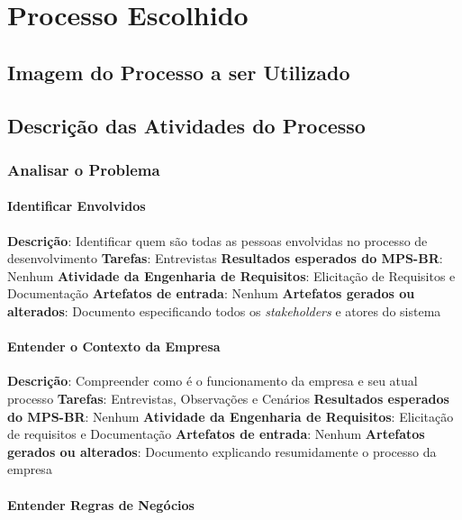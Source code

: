 \chapter{Processo Escolhido}
\label{chosen-process}

\section{Imagem do Processo a ser Utilizado}

\section{Descrição das Atividades do Processo}

\subsection{Analisar o Problema}

\subsubsection{Identificar Envolvidos}

\textbf{Descrição}: Identificar quem são todas as pessoas envolvidas no processo de desenvolvimento
\textbf{Tarefas}: Entrevistas
\textbf{Resultados esperados do MPS-BR}: Nenhum
\textbf{Atividade da Engenharia de Requisitos}: Elicitação de Requisitos e Documentação
\textbf{Artefatos de entrada}: Nenhum
\textbf{Artefatos gerados ou alterados}: Documento especificando todos os \textit{stakeholders} e atores do sistema

\subsubsection{Entender o Contexto da Empresa}

\textbf{Descrição}: Compreender como é o funcionamento da empresa e seu atual processo
\textbf{Tarefas}: Entrevistas, Observações e Cenários
\textbf{Resultados esperados do MPS-BR}: Nenhum
\textbf{Atividade da Engenharia de Requisitos}: Elicitação de requisitos e Documentação
\textbf{Artefatos de entrada}: Nenhum
\textbf{Artefatos gerados ou alterados}: Documento explicando resumidamente o processo da empresa

\subsubsection{Entender Regras de Negócios}


